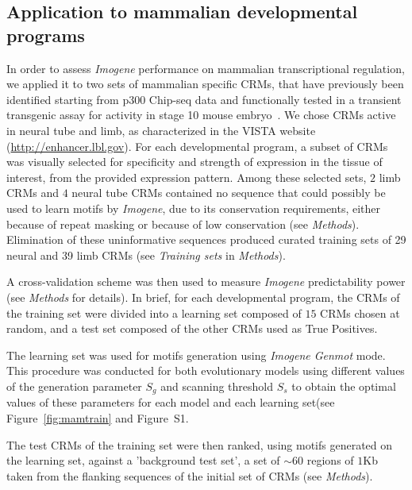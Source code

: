 \documentclass[a4,center,fleqn]{NAR}
\begin{document}
\subsection*{Application to mammalian developmental programs}

In order to assess {\em Imogene} performance on mammalian transcriptional
regulation, we applied it to two sets of mammalian specific CRMs,  that have
previously been identified starting from p300 Chip-seq data and functionally
tested in a transient transgenic assay for activity in stage 10 mouse
embryo~\cite{Visel:2009fr,pmid22138689}.
We chose CRMs active in neural tube and limb, as characterized in the VISTA
website (\url{http://enhancer.lbl.gov}).
For each developmental program, a subset of CRMs was visually selected for
specificity and strength of expression in the tissue of interest, from the
provided expression pattern.
Among these selected sets, $2$ limb CRMs and $4$ neural tube CRMs contained no
sequence that could possibly be used to learn motifs by {\em Imogene}, due to
its conservation requirements, either because of repeat masking or because of
low conservation (see {\em Methods}).
Elimination of these uninformative sequences produced curated training sets of
29 neural and 39 limb CRMs (see {\em Training sets} in {\em Methods}).

A cross-validation scheme was then used to measure {\em Imogene} predictability
power (see {\em Methods} for details).
In brief, for each developmental program, the CRMs of the training set were
divided into a learning set composed of $15$ CRMs chosen at random, and a test
set  composed of the other CRMs used as True Positives.


The learning set was used for motifs generation using {\em Imogene Genmot} mode.
This procedure was conducted for both evolutionary models using different
values of the generation parameter $S_g$ and scanning threshold $S_s$ to obtain
the optimal values of these parameters for each model  and each learning
set(see Figure~\ref{fig:mamtrain} and Figure~S1.

The test CRMs of the training set were then ranked, using  motifs generated on
the learning set, against a 'background test set', a set of $\sim60$ regions of
$1$Kb taken from the flanking sequences of the initial set of CRMs (see {\em
Methods}).
\end{document}
